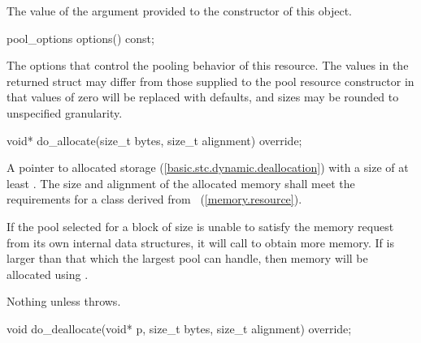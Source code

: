 \begin{itemdescr}
\pnum
\returns
The value of the  argument
provided to the constructor of this object.
\end{itemdescr}

%
%
\begin{itemdecl}
pool_options options() const;
\end{itemdecl}

\begin{itemdescr}
\pnum
\returns
The options that control the pooling behavior of this resource.
The values in the returned struct may differ
from those supplied to the pool resource constructor in that
values of zero will be replaced with 
defaults, and sizes may be rounded to unspecified granularity.
\end{itemdescr}

%
%
\begin{itemdecl}
void* do_allocate(size_t bytes, size_t alignment) override;
\end{itemdecl}

\begin{itemdescr}
\pnum
\returns
A pointer to allocated storage (\ref{basic.stc.dynamic.deallocation})
with a size of at least .
The size and alignment of the allocated memory shall meet the requirements
for a class derived from ~(\ref{memory.resource}).

\pnum
\effects
If the pool selected for a block of size 
is unable to satisfy the memory request from its own internal data structures,
it will call  to obtain more memory.
If  is larger than that which the largest pool can handle,
then memory will be allocated using .

\pnum
\throws
Nothing unless  throws.
\end{itemdescr}

%
%
\begin{itemdecl}
void do_deallocate(void* p, size_t bytes, size_t alignment) override;
\end{itemdecl}

